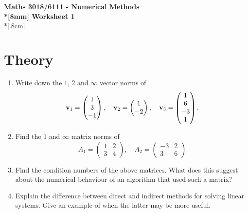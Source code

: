\documentclass[10pt]{article}
\begin{document}
\thispagestyle{empty}
\begin{center}
\textbf{\Large Maths 3018/6111 - Numerical Methods \\*[8mm]
Worksheet 1}\\*[.8cm]
\end{center}

\section*{Theory}

\begin{enumerate}
\item Write down the $1$, $2$ and $\infty$ vector norms of
  \begin{equation*}
    {\bf v}_1 =
    \begin{pmatrix}
      1 \\ 3 \\ -1
    \end{pmatrix}, \quad
    {\bf v}_2 =
    \begin{pmatrix}
      1 \\ -2
    \end{pmatrix}, \quad
    {\bf v}_3 =
    \begin{pmatrix}
      1 \\ 6 \\ -3 \\ 1
    \end{pmatrix}.
  \end{equation*}
\item Find the $1$ and $\infty$ matrix norms of
  \begin{equation*}
    A_1 =
    \begin{pmatrix}
      1 & 2 \\ 3 & 4
    \end{pmatrix}, \quad
    A_2 =
    \begin{pmatrix}
      -3 & 2 \\ 3 & 6
    \end{pmatrix}
  \end{equation*}
\item Find the condition numbers of the above matrices. What does this
  suggest about the numerical behaviour of an algorithm that used such
  a matrix?
\item Explain the difference between direct and indirect methods for
  solving linear systems. Give an example of when the latter may be
  more useful.
\end{enumerate}
\end{document}
